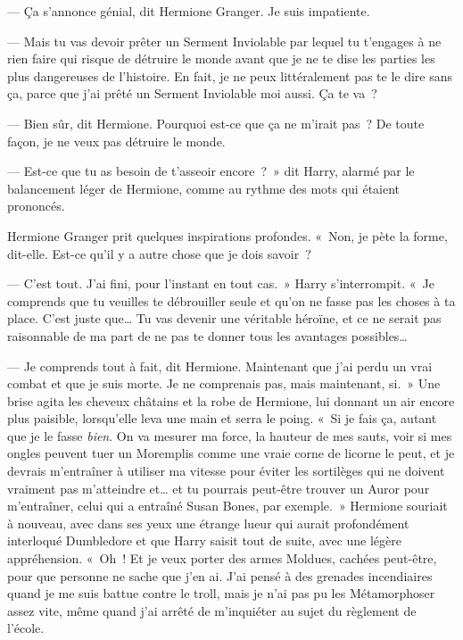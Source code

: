 --- Ça s'annonce génial, dit Hermione Granger. Je suis impatiente.

--- Mais tu vas devoir prêter un Serment Inviolable par lequel tu t'engages à ne rien faire qui risque de détruire le monde avant que je ne te dise les parties les plus dangereuses de l'histoire. En fait, je ne peux littéralement pas te le dire sans ça, parce que j'ai prêté un Serment Inviolable moi aussi. Ça te va~?

--- Bien sûr, dit Hermione. Pourquoi est-ce que ça ne m'irait pas~? De toute façon, je ne veux pas détruire le monde.

--- Est-ce que tu as besoin de t'asseoir encore~?~» dit Harry, alarmé par le balancement léger de Hermione, comme au rythme des mots qui étaient prononcés.

Hermione Granger prit quelques inspirations profondes. «~Non, je pète la forme, dit-elle. Est-ce qu'il y a autre chose que je dois savoir~?

--- C'est tout. J'ai fini, pour l'instant en tout cas.~» Harry s'interrompit. «~Je comprends que tu veuilles te débrouiller seule et qu'on ne fasse pas les choses à ta place. C'est juste que… Tu vas devenir une véritable héroïne, et ce ne serait pas raisonnable de ma part de ne pas te donner tous les avantages possibles…

--- Je comprends tout à fait, dit Hermione. Maintenant que j'ai perdu un vrai combat et que je suis morte. Je ne comprenais pas, mais maintenant, si.~» Une brise agita les cheveux châtains et la robe de Hermione, lui donnant un air encore plus paisible, lorsqu'elle leva une main et serra le poing. «~Si je fais ça, autant que je le fasse \emph{bien}. On va mesurer ma force, la hauteur de mes sauts, voir si mes ongles peuvent tuer un Moremplis comme une vraie corne de licorne le peut, et je devrais m'entraîner à utiliser ma vitesse pour éviter les sortilèges qui ne doivent vraiment pas m'atteindre et… et tu pourrais peut-être trouver un Auror pour m'entraîner, celui qui a entraîné Susan Bones, par exemple.~» Hermione souriait à nouveau, avec dans ses yeux une étrange lueur qui aurait profondément interloqué Dumbledore et que Harry saisit tout de suite, avec une légère appréhension. «~Oh~! Et je veux porter des armes Moldues, cachées peut-être, pour que personne ne sache que j'en ai. J'ai pensé à des grenades incendiaires quand je me suis battue contre le troll, mais je n'ai pas pu les Métamorphoser assez vite, même quand j'ai arrêté de m'inquiéter au sujet du règlement de l'école.

